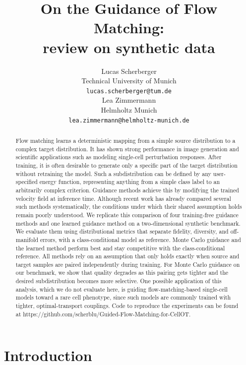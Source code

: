 \documentclass{article}
\title{On the Guidance of Flow Matching: \\review on synthetic data}
\author{%
  Lucas Scherberger \\
  Technical University of Munich \\
  \texttt{lucas.scherberger@tum.de} \\
  \And
  Lea Zimmermann \\
  Helmholtz Munich \\
  \texttt{lea.zimmermann@helmholtz-munich.de} \\
}
\begin{document}
\maketitle


\begin{abstract}
Flow matching learns a deterministic mapping from a simple source distribution to a complex target distribution.
It has shown strong performance in image generation and scientific applications such as modeling single-cell perturbation responses.
After training, it is often desirable to generate only a specific part of the target distribution without retraining the model.
Such a subdistribution can be defined by any user-specified energy function, representing anything from a simple class label to an arbitrarily complex criterion.
Guidance methods achieve this by modifying the trained velocity field at inference time.
Although recent work has already compared several such methods systematically, the conditions under which their shared assumption holds remain poorly understood.
We replicate this comparison of four training-free guidance methods and one learned guidance method on a two-dimensional synthetic benchmark.
We evaluate them using distributional metrics that separate fidelity, diversity, and off-manifold errors, with a class-conditional model as reference.
Monte Carlo guidance and the learned method perform best and stay competitive with the class-conditional reference.
All methods rely on an assumption that only holds exactly when source and target samples are paired independently during training.
For Monte Carlo guidance on our benchmark, we show that quality degrades as this pairing gets tighter and the desired subdistribution becomes more selective.
One possible application of this analysis, which we do not evaluate here, is guiding flow-matching-based single-cell models toward a rare cell phenotype, since such models are commonly trained with tighter, optimal-transport couplings.
Code to reproduce the experiments can be found at https://github.com/scherblu/Guided-Flow-Matching-for-CellOT.
\end{abstract}


\section{Introduction}
\end{document}
